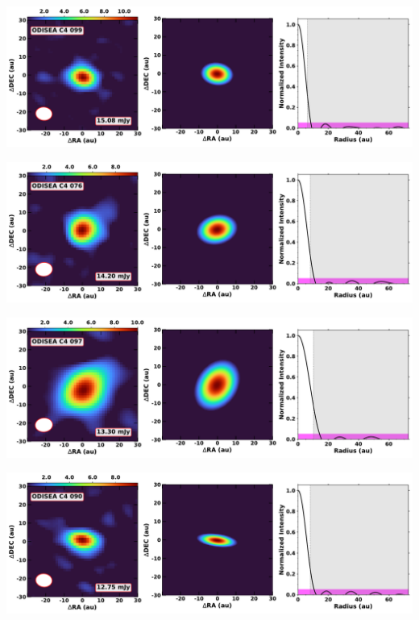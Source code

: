\vspace{0pt}
\begin{minipage}{.49\textwidth}
	 \centering
	 	 \hrulesep
	 	 \includegraphics[width=1\linewidth]{pdf/0+I_F/014_odisea_c4_099_cutout.pdf}
\end{minipage}%
\vrulesep
\begin{minipage}{.49\textwidth}
	 \centering
	 	 \hrulesep
	 	 \includegraphics[width=1\linewidth]{pdf/0+I_F/012_odisea_c4_076_cutout.pdf}
\end{minipage}%
\vspace{0pt}
\begin{minipage}{.49\textwidth}
	 \centering
	 	 \hrulesep
	 	 \includegraphics[width=1\linewidth]{pdf/0+I_F/011_odisea_c4_097_cutout.pdf}
\end{minipage}%
\vrulesep
\begin{minipage}{.49\textwidth}
	 \centering
	 	 \hrulesep
	 	 \includegraphics[width=1\linewidth]{pdf/0+I_F/009_odisea_c4_090_cutout.pdf}
\end{minipage}%
